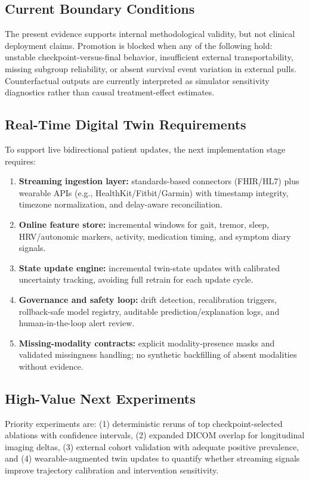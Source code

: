 \documentclass[journal,twoside,web]{ieeecolor}
\begin{document}
\subsection{Current Boundary Conditions}
The present evidence supports internal methodological validity, but not clinical deployment claims. Promotion is blocked when any of the following hold: unstable checkpoint-versus-final behavior, insufficient external transportability, missing subgroup reliability, or absent survival event variation in external pulls. Counterfactual outputs are currently interpreted as simulator sensitivity diagnostics rather than causal treatment-effect estimates.

\subsection{Real-Time Digital Twin Requirements}
To support live bidirectional patient updates, the next implementation stage requires:
\begin{enumerate}
\item \textbf{Streaming ingestion layer:} standards-based connectors (FHIR/HL7) plus wearable APIs (e.g., HealthKit/Fitbit/Garmin) with timestamp integrity, timezone normalization, and delay-aware reconciliation.
\item \textbf{Online feature store:} incremental windows for gait, tremor, sleep, HRV/autonomic markers, activity, medication timing, and symptom diary signals.
\item \textbf{State update engine:} incremental twin-state updates with calibrated uncertainty tracking, avoiding full retrain for each update cycle.
\item \textbf{Governance and safety loop:} drift detection, recalibration triggers, rollback-safe model registry, auditable prediction/explanation logs, and human-in-the-loop alert review.
\item \textbf{Missing-modality contracts:} explicit modality-presence masks and validated missingness handling; no synthetic backfilling of absent modalities without evidence.
\end{enumerate}

\subsection{High-Value Next Experiments}
Priority experiments are: (1) deterministic reruns of top checkpoint-selected ablations with confidence intervals, (2) expanded DICOM overlap for longitudinal imaging deltas, (3) external cohort validation with adequate positive prevalence, and (4) wearable-augmented twin updates to quantify whether streaming signals improve trajectory calibration and intervention sensitivity.
\end{document}
